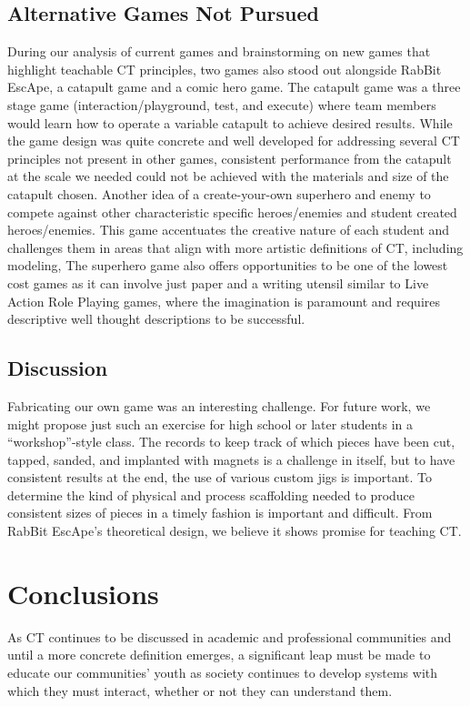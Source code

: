 \documentclass{acm_proc_article-sp}
\begin{document}
\subsection{Alternative Games Not Pursued}
During our analysis of current games and brainstorming on new games that highlight teachable CT principles, two games also stood out alongside RabBit EscApe, a catapult game and a comic hero game.
The catapult game was a three stage game (interaction/playground, test, and execute) where team members would learn how to operate a variable catapult to achieve desired results.
While the game design was quite concrete and well developed for addressing several CT principles not present in other games, consistent performance from the catapult at the scale we needed could not be achieved with the materials and size of the catapult chosen.
Another idea of a create-your-own superhero and enemy to compete against other characteristic specific heroes/enemies and student created heroes/enemies.
This game accentuates the creative nature of each student and challenges them in areas that align with more artistic definitions of CT, including modeling, 
The superhero game also offers opportunities to be one of the lowest cost games as it can involve just paper and a writing utensil similar to Live Action Role Playing games, where the imagination is paramount and requires descriptive well thought descriptions to be successful.

\subsection{Discussion}
Fabricating our own game was an interesting challenge. For future work, we might propose just such an exercise for high school or later students in a ``workshop''-style class.
The records to keep track of which pieces have been cut, tapped, sanded, and implanted with magnets is a challenge in itself, but to have consistent results at the end, the use of various custom jigs is important.
To determine the kind of physical and process scaffolding needed to produce consistent sizes of pieces in a timely fashion is important and difficult. 
From RabBit EscApe's theoretical design, we believe it shows promise for teaching CT.

\section{Conclusions}
As CT continues to be discussed in academic and professional communities and until a more concrete definition emerges, a significant leap must be made to educate our communities' youth as society continues to develop systems with which they must interact, whether or not they can understand them. 
\end{document}
